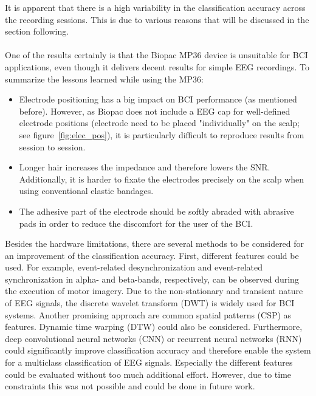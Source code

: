 \documentclass[a4paper,oneside, openright,12pt]{report}
\begin{document}
It is apparent that there is a high variability in the classification accuracy across the recording sessions. This is due to various reasons that will be discussed in the section following.\\\\
One of the results certainly is that the Biopac MP36 device is unsuitable for BCI applications, even though it delivers decent results for simple EEG recordings. To summarize the lessons learned while using the MP36:
\begin{itemize}
	\item Electrode positioning has a big impact on BCI performance (as mentioned before). However, as Biopac does not include a EEG cap for well-defined electrode positions (electrode need to be placed "individually" on the scalp; see figure~\ref{fig:elec_pos}), it is particularly difficult to reproduce results from session to session.
	\item Longer hair increases the impedance and therefore lowers the SNR. Additionally, it is harder to fixate the electrodes precisely on the scalp when using conventional elastic bandages.
	\item The adhesive part of the electrode should be softly abraded with abrasive pads in order to reduce the discomfort for the user of the BCI.
\end{itemize}

Besides the hardware limitations, there are several methods to be considered for an improvement of the classification accuracy. First, different features could be used. For example, event-related desynchronization and event-related synchronization in alpha- and beta-bands, respectively, can be observed during the execution of motor imagery. Due to the non-stationary and transient nature of EEG signals, the discrete wavelet transform (DWT) is widely used for BCI systems. Another promising approach are common spatial patterns (CSP) as features. Dynamic time warping (DTW) could also be considered. Furthermore, deep convolutional neural networks (CNN) or recurrent neural networks (RNN) could significantly improve classification accuracy and therefore enable the system for a multiclass classification of EEG signals. Especially the different features could be evaluated without too much additional effort. However, due to time constraints this was not possible and could be done in future work.

\end{document}
